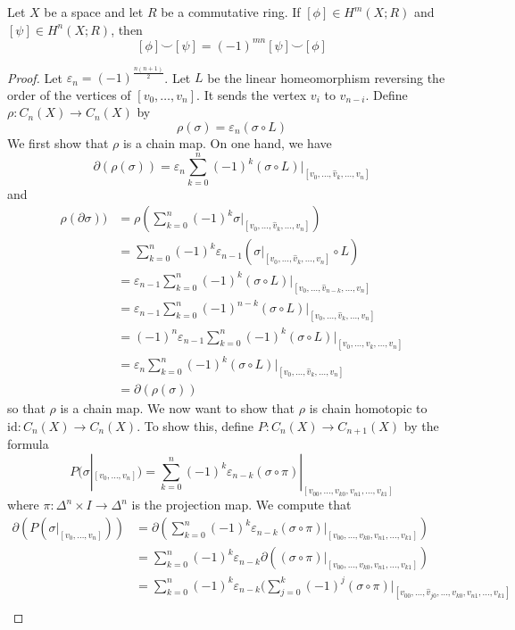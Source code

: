 \documentclass[a4paper]{article}
\begin{document}
\begin{prp}{}{} Let $X$ be a space and let $R$ be a commutative ring. If $[\phi]\in H^m(X;R)$ and $[\psi]\in H^n(X;R)$, then $$[\phi]\smile[\psi]=(-1)^{mn}[\psi]\smile[\phi]$$ 
\begin{proof}
Let $\varepsilon_n=(-1)^{\frac{n(n+1)}{2}}$. Let $L$ be the linear homeomorphism reversing the order of the vertices of $[v_0,\dots,v_n]$. It sends the vertex $v_i$ to $v_{n-i}$. Define $\rho:C_n(X)\to C_n(X)$ by $$\rho(\sigma)=\varepsilon_n(\sigma\circ L)$$ We first show that $\rho$ is a chain map. On one hand, we have $$\partial(\rho(\sigma))=\varepsilon_n\sum_{k=0}^n(-1)^k(\sigma\circ L)|_{[v_0,\dots,\widehat{v}_k,\dots,v_n]}$$ and 
\begin{align*}
\rho(\partial\sigma))&=\rho\left(\sum_{k=0}^n(-1)^k\sigma|_{[v_0,\dots,\widehat{v}_k,\dots,v_n]}\right)\\
&=\sum_{k=0}^n(-1)^k\varepsilon_{n-1}(\sigma|_{[v_0,\dots,\widehat{v}_k,\dots,v_n]}\circ L)\\
&=\varepsilon_{n-1}\sum_{k=0}^n(-1)^k(\sigma\circ L)|_{[v_0,\dots,\widehat{v}_{n-k},\dots,v_n]}\\
&=\varepsilon_{n-1}\sum_{k=0}^n(-1)^{n-k}(\sigma\circ L)|_{[v_0,\dots,\widehat{v}_k,\dots,v_n]}\\
&=(-1)^n\varepsilon_{n-1}\sum_{k=0}^n(-1)^k(\sigma\circ L)|_{[v_0,\dots,\widehat{v}_k,\dots,v_n]}\\
&=\varepsilon_n\sum_{k=0}^n(-1)^k(\sigma\circ L)|_{[v_0,\dots,\widehat{v}_k,\dots,v_n]}\\
&=\partial(\rho(\sigma))
\end{align*}
so that $\rho$ is a chain map. We now want to show that $\rho$ is chain homotopic to $\text{id}:C_n(X)\to C_n(X)$. To show this, define $P:C_n(X)\to C_{n+1}(X)$ by the formula $$P(\sigma|_{[v_0,\dots,v_n]})=\sum_{k=0}^n(-1)^k\varepsilon_{n-k}(\sigma\circ\pi)|_{[v_{00},\dots,v_{k0},v_{n1},\dots,v_{k1}]}$$ where $\pi:\Delta^n\times I\to\Delta^n$ is the projection map. We compute that 
\begin{align*}
\partial(P(\sigma|_{[v_0,\dots,v_n]}))&=\partial\left(\sum_{k=0}^n(-1)^k\varepsilon_{n-k}(\sigma\circ\pi)|_{[v_{00},\dots,v_{k0},v_{n1},\dots,v_{k1}]}\right)\\
&=\sum_{k=0}^n(-1)^k\varepsilon_{n-k}\partial((\sigma\circ\pi)|_{[v_{00},\dots,v_{k0},v_{n1},\dots,v_{k1}]})\\
&=\sum_{k=0}^n(-1)^k\varepsilon_{n-k}\Big(\sum_{j=0}^k(-1)^j(\sigma\circ\pi)|_{[v_{00},\dots,\widehat{v}_{j0},\dots,v_{k0},v_{n1},\dots,v_{k1}]}\\

\end{align*}
\end{proof}
\end{prp}
\end{document}
